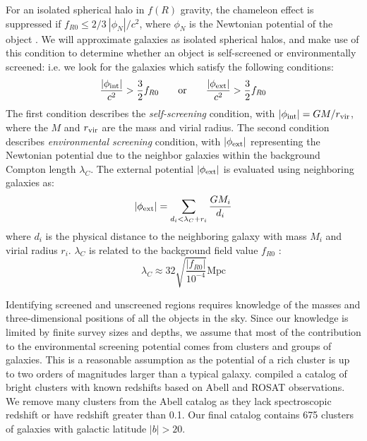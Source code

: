 \documentclass[useAMS,usenatbib,twocolumn]{mn2e}
\begin{document}
For an isolated spherical halo in $f(R)$ gravity,
the chameleon effect is suppressed if $f_{R0} \leq 2/3\
|\phi_N|/c^2$, where $\phi_N$ is the Newtonian  potential of the object
\citep{hu07}. We will approximate galaxies as isolated spherical halos,
and make use of this condition to determine whether an
object is self-screened or environmentally screened: i.e. we look for the
galaxies which satisfy the following conditions: 
\begin{equation}
\label{eq:criterion} 
 \frac{|\phi_{\rm int}|}{c^2}>\frac{3}{2} f_{R0}\; \; \; \; \; \; \; \mathrm{or}
\; \; \; \; \; \; \; \frac{|\phi_{\rm ext}|}{c^2}>\frac{3}{2} f_{R0}
\end{equation}
The first condition describes the {\it self-screening} condition, with 
$ |\phi_{\rm int}|= GM/r_{\rm vir}$, where the $M$ and $r_{\rm vir}$ are the
mass and virial radius. The second condition describes {\it environmental
screening} condition, with $|\phi_{\rm ext}|$ representing the
Newtonian potential due to the neighbor galaxies within the background Compton
length $\lambda_C$.
The external potential $|\phi_{\rm ext}|$ is evaluated using 
neighboring galaxies as:
\begin{equation}\label{eq:criterion22} 
 |\phi_{\rm ext}|= \sum_{d_i<\lambda_C+r_i} \frac{GM_i}{d_i}
\end{equation}
where $d_i$ is the physical distance to the neighboring
galaxy with mass $M_i$ and virial radius $r_i$. $\lambda_C$ is related
to the background field value $f_{R0}$
\citep{sch09}:
\begin{equation}
 \lambda_C \approx 32 \sqrt{\frac{\left|f_{R0}\right|}{10^{-4}}} \mathrm{ Mpc}
 \label{eq:compton}
\end{equation}

Identifying screened and unscreened regions requires knowledge of the masses and
three-dimensional positions of all the objects in the sky.
Since our knowledge is limited by finite survey sizes and depths,
we assume that most of the contribution to the environmental screening
potential comes from
clusters and groups of galaxies. This is a reasonable assumption as the
potential of a rich cluster is up to 
two orders of magnitudes larger than a typical galaxy. \citet{cabre2012}
compiled a catalog of bright clusters with known redshifts based on 
Abell \citep{abe89} and ROSAT \citep{ebe96} observations. We remove many
clusters from the Abell catalog as they lack spectroscopic
redshift or have redshift greater than 0.1. Our final catalog contains 675
clusters of galaxies with galactic latitude $\left|b\right| > 20$.
\end{document}
